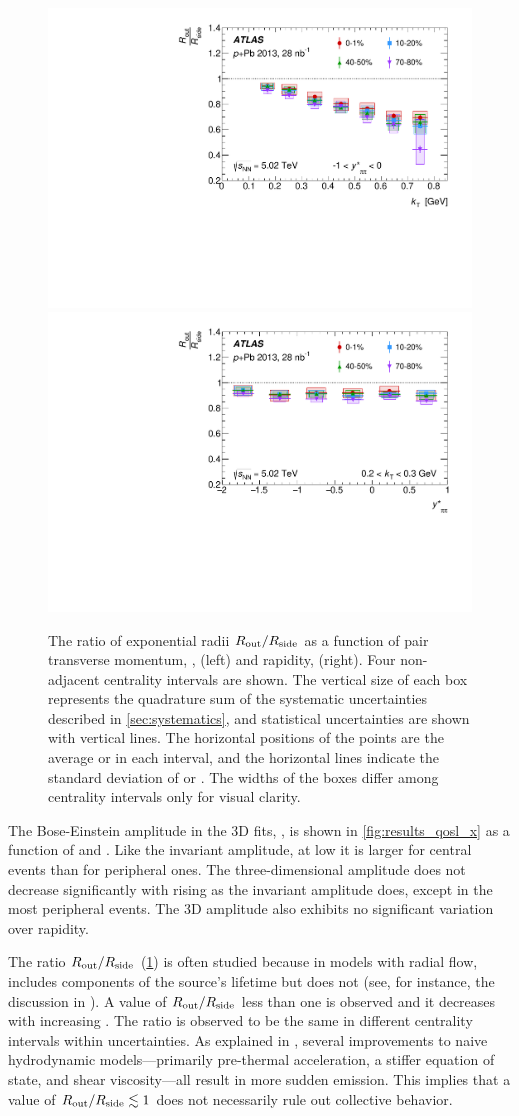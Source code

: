\begin{figure}[ht]
\centering
\includegraphics[width=0.49\linewidth]{canqosl_RoutOverRside_vs_kt.pdf}
\includegraphics[width=0.49\linewidth]{canqosl_RoutOverRside_vs_kys.pdf}
\caption{The ratio of exponential radii $R_{\mathrm{out}}/R_{\mathrm{side}}$ as a function of pair transverse momentum, \kt, (left) and rapidity, \kys (right). Four non-adjacent centrality intervals are shown. The vertical size of each box represents the quadrature sum of the systematic uncertainties described in \cref{sec:systematics}, and statistical uncertainties are shown with vertical lines. The horizontal positions of the points are the average \kt or \kys in each interval, and the horizontal lines indicate the standard deviation of \kt or \kys. The widths of the boxes differ among centrality intervals only for visual clarity.}
\label{fig:results_RoutOverRside_kt}
\end{figure}

The Bose-Einstein amplitude in the 3D fits, \losl, is shown in \cref{fig:results_qosl_x} as a function of \kt and \kys. Like the invariant amplitude, at low \kt it is larger for central events than for peripheral ones. The three-dimensional amplitude does not decrease significantly with rising \kt as the invariant amplitude does, except in the most peripheral events. The 3D amplitude also exhibits no significant variation over rapidity.

The ratio $R_{\mathrm{out}}/R_{\mathrm{side}}$ (\cref{fig:results_RoutOverRside_kt}) is often studied because in models with radial flow, \Rout includes components of the source's lifetime but \Rside does not (see, for instance, the discussion in ).
A value of $R_{\mathrm{out}}/R_{\mathrm{side}}$ less than one is observed and it decreases with increasing \kt.
The ratio is observed to be the same in different centrality intervals within uncertainties.
As explained in , several improvements to naive hydrodynamic models---primarily pre-thermal acceleration, a stiffer equation of state, and shear viscosity---all result in more sudden emission.
This implies that a value of $R_{\mathrm{out}}/R_{\mathrm{side}} \lesssim 1$ does not necessarily rule out collective behavior.

